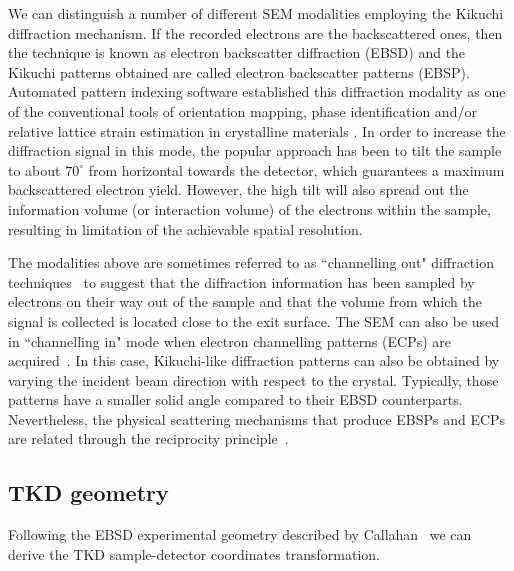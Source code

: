 We can distinguish a number of different SEM modalities employing the Kikuchi diffraction mechanism. If the recorded electrons are the backscattered ones, then the technique is known as electron backscatter diffraction (EBSD) and the Kikuchi patterns obtained are called electron backscatter patterns (EBSP). Automated pattern indexing software established this diffraction modality as one of the conventional tools of orientation mapping, phase identification and/or relative lattice strain estimation in crystalline materials \cite{schwartz2009a}. In order to increase the diffraction signal in this mode, the popular approach has been to tilt the sample to about $70^{\circ}$ from horizontal towards the detector, which guarantees a maximum backscattered electron yield. However, the high tilt will also spread out the information volume (or interaction volume) of the electrons within the sample, resulting in limitation of the achievable spatial resolution.

The modalities above are sometimes referred to as ``channelling out" diffraction techniques~\cite{joy1994} to suggest that the diffraction information has been sampled by electrons on their way out of the sample and that the volume from which the signal is collected is located close to the exit surface. The SEM can also be used in ``channelling in" mode when electron channelling patterns (ECPs) are acquired~\cite{coates1967,joy1982}. In this case, Kikuchi-like diffraction patterns can also be obtained by varying the incident beam direction with respect to the crystal. Typically, those patterns have a smaller solid angle compared to their EBSD counterparts. Nevertheless, the physical scattering mechanisms that produce EBSPs and ECPs are related through the reciprocity principle~\cite{reimerSEM}.






\subsection{TKD geometry}

Following the EBSD experimental geometry described by Callahan~\cite{degraef2013e} we can derive the TKD sample-detector coordinates transformation.


